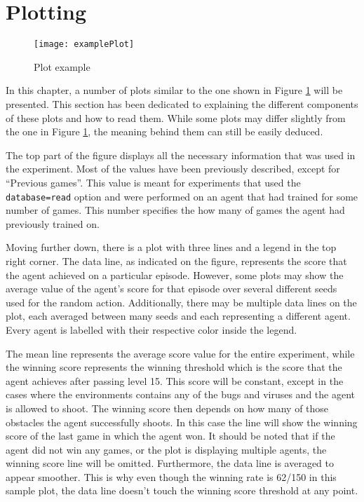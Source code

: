 \section{Plotting}

\begin{figure}[h]
    \centering
    \texttt{[image: examplePlot]}
    \caption{Plot example}
    \label{fig:plt_eg}
\end{figure}

In this chapter, a number of plots similar to the one shown in Figure \ref{fig:plt_eg} will be presented. This section has been dedicated to explaining the different components of these plots and how to read them. While some plots may differ slightly from the one in Figure \ref{fig:plt_eg}, the meaning behind them can still be easily deduced.

The top part of the figure displays all the necessary information that was used in the experiment. Most of the values have been previously described, except for ``Previous games''. This value is meant for experiments that used the \texttt{database=read} option and were performed on an agent that had trained for some number of games. This number specifies the how many of games the agent had previously trained on.

Moving further down, there is a plot with three lines and a legend in the top right corner. The data line, as indicated on the figure, represents the score that the agent achieved on a particular episode. However, some plots may show the average value of the agent's score for that episode over several different seeds used for the random action. Additionally, there may be multiple data lines on the plot, each averaged between many seeds and each representing a different agent. Every agent is labelled with their respective color inside the legend.

The mean line represents the average score value for the entire experiment, while the winning score represents the winning threshold which is the score that the agent achieves after passing level 15. This score will be constant, except in the cases where the environments contains any of the bugs and viruses and the agent is allowed to shoot. The winning score then depends on how many of those obstacles the agent successfully shoots. In this case the line will show the winning score of the last game in which the agent won. It should be noted that if the agent did not win any games, or the plot is displaying multiple agents, the winning score line will be omitted. Furthermore, the data line is averaged to appear smoother. This is why even though the winning rate is 62/150 in this sample plot, the data line doesn't touch the winning score threshold at any point.

